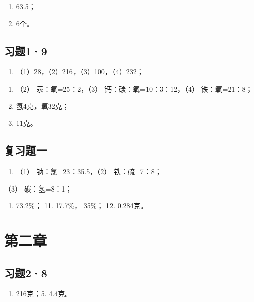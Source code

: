 \begin{enumerate}[start=6]
\item
  63.5；
\item
  6个。
\end{enumerate}

\subsection{习题1·9}

\begin{enumerate}[start=7]
\item
  （1）28，（2）216，（3）100，（4）232；
\end{enumerate}

\begin{enumerate}[start=8]
\item
  （2） 汞：氧=25：2，（3） 钙：碳：氧=10：3：12，（4） 铁：氧=21：8；
\item
  氢4克，氧32克；
\item
  11克。
\end{enumerate}

\subsection{复习题一}

\begin{enumerate}[start=9]
\item
  （1） 钠：氯=23：35.5，（2） 铁：硫=7：8；
\end{enumerate}

（3） 碳：氢=8：1；

\begin{enumerate}[start=10]
\item
  73.2\%； 11. 17.7\%， 35\%； 12. 0.284克。
\end{enumerate}

\section{第二章}

\subsection{习题2·8}

\begin{enumerate}[start=4]
\item
  216克；5. 4.4克。
\end{enumerate}


